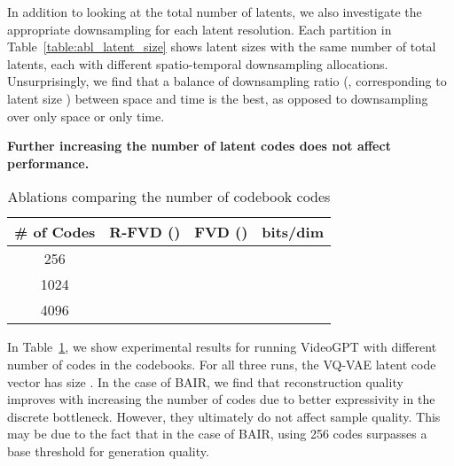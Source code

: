 \documentclass{article}
\begin{document}
In addition to looking at the total number of latents, we also investigate the appropriate downsampling for each latent resolution. Each partition in Table~\ref{table:abl_latent_size} shows latent sizes with the same number of total latents, each with different spatio-temporal downsampling allocations. Unsurprisingly, we find that a balance of downsampling ratio (, corresponding to latent size ) between space and time is the best, as opposed to downsampling over only space or only time. 

\textbf{Further increasing the number of latent codes does not affect performance.}
\begin{table}[H]
\begin{minipage}{.5\textwidth}
\centering
\caption{Ablations comparing the number of codebook codes}
\label{table:abl_n_codes}
\begin{tabular}{@{}cccc@{}}
\toprule
\# of Codes & R-FVD () & FVD () & bits/dim \\ \midrule
256         &                &     &       \\
1024        &                &     &       \\
4096        &                &     &       \\ \bottomrule
\end{tabular}
\end{minipage}
\end{table}
In Table~\ref{table:abl_n_codes}, we show experimental results for running VideoGPT with different number of codes in the codebooks. For all three runs, the VQ-VAE latent code vector has size . In the case of BAIR, we find that reconstruction quality improves with increasing the number of codes due to better expressivity in the discrete bottleneck. However, they ultimately do not affect sample quality. This may be due to the fact that in the case of BAIR, using 256 codes surpasses a base threshold for generation quality.
\end{document}
